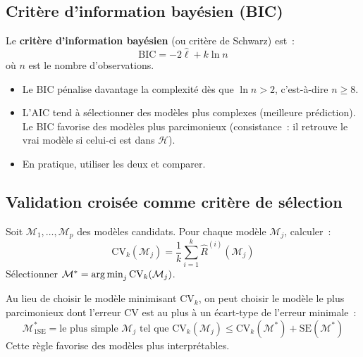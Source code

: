\subsection{Crit\`ere d'information bay\'esien (BIC)}

\begin{definition}[BIC]
\label{def:bic}
Le \textbf{crit\`ere d'information bay\'esien} (ou crit\`ere
de Schwarz) est~:
\begin{equation}
  \text{BIC} = -2\hat{\ell} + k \ln n
  \label{eq:bic}
\end{equation}
o\`u $n$ est le nombre d'observations.
\end{definition}

\begin{attention}[title=\textbf{Diff\'erences AIC vs BIC}]
\begin{itemize}
  \item Le BIC p\'enalise davantage la complexit\'e d\`es que $\ln n > 2$,
    c'est-\`a-dire $n \geq 8$.
  \item L'AIC tend \`a s\'electionner des mod\`eles plus complexes (meilleure
    pr\'ediction). Le BIC favorise des mod\`eles plus parcimonieux
    (consistance~: il retrouve le vrai mod\`ele si celui-ci est dans
    $\mathcal{H}$).
  \item En pratique, utiliser les deux et comparer.
\end{itemize}
\end{attention}

\subsection{Validation crois\'ee comme crit\`ere de s\'election}

\begin{formules}[title=\textbf{Validation crois\'ee $k$-fold pour la s\'election}]
Soit $\mathcal{M}_1, \ldots, \mathcal{M}_p$ des mod\`eles candidats. Pour
chaque mod\`ele $\mathcal{M}_j$, calculer~:
\begin{equation}
  \text{CV}_k(\mathcal{M}_j) = \frac{1}{k} \sum_{i=1}^k
  \hat{R}^{(i)}(\mathcal{M}_j)
\end{equation}
S\'electionner $\mathcal{M}^* = \operatorname*{arg\,min}_j \text{CV}_k(\mathcal{M}_j)$.
\end{formules}

\begin{proposition}
\label{prop:one-se}
Au lieu de choisir le mod\`ele minimisant $\text{CV}_k$, on peut choisir
le mod\`ele le plus parcimonieux dont l'erreur CV est au plus \`a un
\'ecart-type de l'erreur minimale~:
\begin{equation}
  \mathcal{M}^*_{\text{1SE}} = \text{le plus simple } \mathcal{M}_j
  \text{ tel que } \text{CV}_k(\mathcal{M}_j) \leq
  \text{CV}_k(\mathcal{M}^*) + \text{SE}(\mathcal{M}^*)
\end{equation}
Cette r\`egle favorise des mod\`eles plus interpr\'etables.
\end{proposition}

